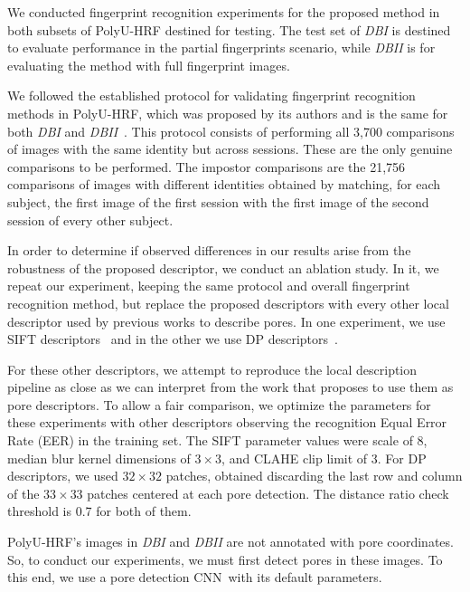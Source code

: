 \documentclass[10pt,twocolumn,letterpaper]{article}
\begin{document}
We conducted fingerprint recognition experiments for the proposed method in both subsets of PolyU-HRF destined for testing.
The test set of \textit{DBI} is destined to evaluate performance in the partial fingerprints scenario, while \textit{DBII} is for evaluating the method with full fingerprint images.

We followed the established protocol for validating fingerprint recognition methods in PolyU-HRF, which was proposed by its authors and is the same for both \textit{DBI} and \textit{DBII}~\cite{direct-pore}.
This protocol consists of performing all 3,700 comparisons of images with the same identity but across sessions.
These are the only genuine comparisons to be performed.
The impostor comparisons are the 21,756 comparisons of images with different identities obtained by matching, for each subject, the first image of the first session with the first image of the second session of every other subject.

In order to determine if observed differences in our results arise from the robustness of the proposed descriptor, we conduct an ablation study.
In it, we repeat our experiment, keeping the same protocol and overall fingerprint recognition method, but replace the proposed descriptors with every other local descriptor used by previous works to describe pores.
In one experiment, we use SIFT descriptors~\cite{ridge-reconstruction} and in the other we use DP descriptors~\cite{direct-pore, td-sparse, feature-guided}.

For these other descriptors, we attempt to reproduce the local description pipeline as close as we can interpret from the work that proposes to use them as pore descriptors.
To allow a fair comparison, we optimize the parameters for these experiments with other descriptors observing the recognition Equal Error Rate (EER) in the training set.
The SIFT parameter values were scale of 8, median blur kernel dimensions of ${3 \times 3}$, and CLAHE clip limit of 3.
For DP descriptors, we used ${32 \times 32}$ patches, obtained discarding the last row and column of the ${33 \times 33}$ patches centered at each pore detection.
The distance ratio check threshold is 0.7 for both of them.

PolyU-HRF's images in \textit{DBI} and \textit{DBII} are not annotated with pore coordinates.
So, to conduct our experiments, we must first detect pores in these images.
To this end, we use a pore detection CNN\ifcvprfinal~\cite{fcn-pore-det}\else\cite{supp-fcn-pore-det}\fi with its default parameters. 
\end{document}
